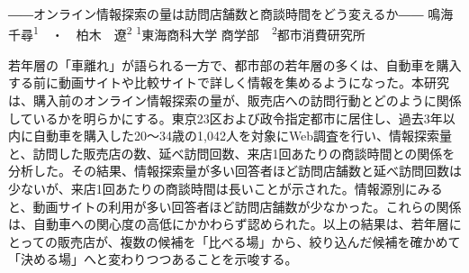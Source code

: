 
\renewcommand*\paperlabel{架空論文Ｘ}
\renewcommand*\journalname{消費と流通の研究}
\renewcommand*\journalvol{第18巻 第2号（2026年）}
\renewcommand*\runninghead{鳴海・柏木：自動車購入前の情報探索と販売店訪問}



{――オンライン情報探索の量は訪問店舗数と商談時間をどう変えるか――}
{鳴海　千尋\textsuperscript{1}　・　柏木　遼\textsuperscript{2}}
{\textsuperscript{1}東海商科大学 商学部　\textsuperscript{2}都市消費研究所}


\begin{abstractbox}
若年層の「車離れ」が語られる一方で、都市部の若年層の多くは、自動車を購入する前に動画サイトや比較サイトで詳しく情報を集めるようになった。本研究は、購入前のオンライン情報探索の量が、販売店への訪問行動とどのように関係しているかを明らかにする。東京23区および政令指定都市に居住し、過去3年以内に自動車を購入した20〜34歳の1,042人を対象にWeb調査を行い、情報探索量と、訪問した販売店の数、延べ訪問回数、来店1回あたりの商談時間との関係を分析した。その結果、情報探索量が多い回答者ほど訪問店舗数と延べ訪問回数は少ないが、来店1回あたりの商談時間は長いことが示された。情報源別にみると、動画サイトの利用が多い回答者ほど訪問店舗数が少なかった。これらの関係は、自動車への関心度の高低にかかわらず認められた。以上の結果は、若年層にとっての販売店が、複数の候補を「比べる場」から、絞り込んだ候補を確かめて「決める場」へと変わりつつあることを示唆する。
\end{abstractbox}

